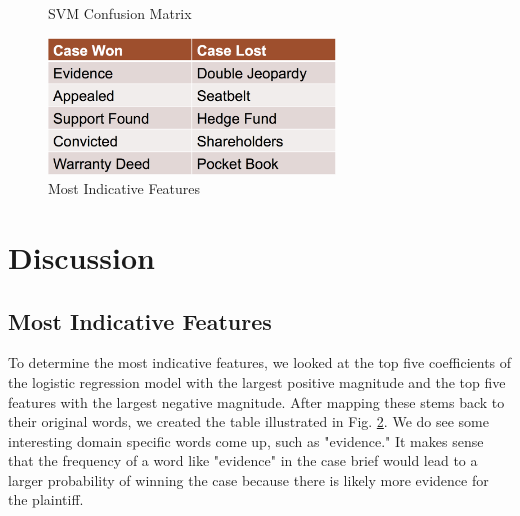 \documentclass[journal]{IEEEtran}
\begin{document}
\begin{figure}
    \centering
    \caption{SVM Confusion Matrix}
    \label{fig:SVM}
\end{figure}

\begin{figure}
    \centering
    \includegraphics[width=3in]{mostIndicativeFeatures.png}
    \caption{Most Indicative Features}
    \label{fig:msf}
\end{figure}

\section{Discussion}

\subsection{Most Indicative Features}

To determine the most indicative features, we looked at the top five coefficients of the logistic regression model with the largest positive magnitude and the top five features with the largest negative magnitude. After mapping these stems back to their original words, we created the table illustrated in Fig. \ref{fig:msf}. We do see some interesting domain specific words come up, such as "evidence." It makes sense that the frequency of a word like "evidence" in the case brief would lead to a larger probability of winning the case because there is likely more evidence for the plaintiff. 
\end{document}
